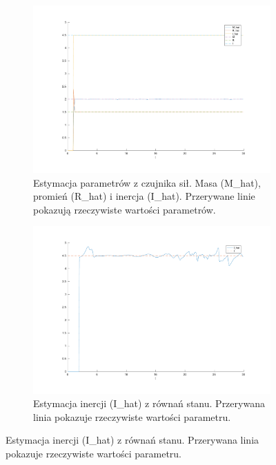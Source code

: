 \documentclass[a4paper, 10pt]{article}
\begin{document}
\begin{figure}
\begin{subfigure}{.5\textwidth}
		\includegraphics[width=\linewidth]{mrozenie_c}
		\caption{Estymacja parametrów z czujnika sił. Masa (M\_hat), promień (R\_hat) i inercja (I\_hat). Przerywane linie pokazują rzeczywiste wartości parametrów.}
		\label{fig:mrozenie_c}
	\end{subfigure}%
	\begin{subfigure}{.5\textwidth}
		\centering
		\includegraphics[width=\linewidth]{mrozenie_r}
		\caption{Estymacja inercji (I\_hat) z równań stanu. Przerywana linia pokazuje rzeczywiste wartości parametru.}
		\label{fig:mrozenie_r}
	\end{subfigure}


\end{figure}
\end{document}
